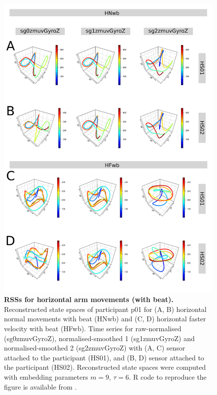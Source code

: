 \begin{figure}[!h]
\centering
\includegraphics[height=0.8\textheight]{rss_Hwb_w500}
\caption{
	{\bf RSSs for horizontal arm movements (with beat).}
	Reconstructed state spaces of participant p01 for 
	(A, B) horizontal normal movements with beat (HNwb) and 
	(C, D) horizontal faster velocity with beat (HFwb).
	Time series for raw-normalised (sg0zmuvGyroZ), 
	normalised-smoothed 1 (sg1zmuvGyroZ) and 
	normalised-smoothed 2 (sg2zmuvGyroZ) with
	(A, C) sensor attached to the participant (HS01), and
	(B, D) sensor attached to the participant (HS02).	
	Reconstructed state spaces were computed with 
	embedding parameters $m=9$, $\tau=6$.
	R code to reproduce the figure is available from \cite{hwum2018}.
        }
     \label{fig:rss_Hwb_w500}
\end{figure}



